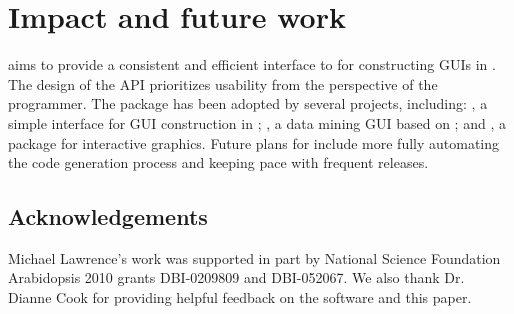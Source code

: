 \documentclass[article,shortnames]{jss}
\begin{document}
\section{Impact and future work}

 aims to provide a consistent and efficient interface to
for constructing GUIs in . The design of the API
prioritizes
usability from the perspective of the  programmer.
The package has been adopted by several projects, including:
\citep{gWidgets}, a simple interface for GUI construction in
; 
 \citep{rattle}, a data mining GUI based on
; and 
 \citep{playwith}, a package for interactive
graphics. Future plans for  include more fully automating
the code 
generation process and keeping pace with frequent  releases.

\subsection*{Acknowledgements}

Michael Lawrence's work was supported in part by National Science
Foundation Arabidopsis 2010 grants DBI-0209809 and DBI-052067. We also
thank Dr. Dianne Cook for providing helpful feedback on the software
and this paper.

%







\end{document}
